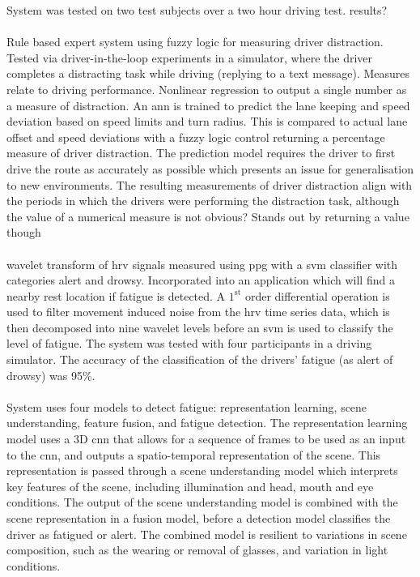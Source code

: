 \documentclass[11pt, parskip=half*,twoside=false]{scrbook}
\begin{document}
System was tested on two test subjects over a two hour driving test. results?

\paragraph{\citet{aksjonovDetectionEvaluationDriver2019}} Rule based expert system using fuzzy logic for measuring driver distraction. Tested via driver-in-the-loop experiments in a simulator, where the driver completes a distracting task while driving (replying to a text message). Measures relate to driving performance. Nonlinear regression to output a single number as a measure of distraction. An \gls{ann} is trained to predict the lane keeping and speed deviation based on speed limits and turn radius. This is compared to actual lane offset and speed deviations with a fuzzy logic control returning a percentage measure of driver distraction. The prediction model requires the driver to first drive the route as accurately as possible which presents an issue for generalisation to new environments. The resulting measurements of driver distraction align with the periods in which the drivers were performing the distraction task, although the value of a numerical measure is not obvious?  Stands out by returning a value though

\paragraph{\citet{liDetectionDriverDrowsiness2013}} wavelet transform of \gls{hrv} signals measured using \gls{ppg} with a \gls{svm} classifier with categories alert and drowsy. Incorporated into an application which will find a nearby rest location if fatigue is detected. A $1^\text{st}$ order differential operation is used to filter movement induced noise from the  \gls{hrv} time series data, which is then decomposed into nine wavelet levels before an \gls{svm} is used to classify the level of fatigue. The system was tested with four participants in a driving simulator. The accuracy of the classification of the drivers' fatigue (as alert of drowsy) was 95\%.

\paragraph{\citet{yuDriverDrowsinessDetection2019}} System uses four models to detect fatigue: representation learning, scene understanding, feature fusion, and fatigue detection. The representation learning model uses a 3D \gls{cnn} that allows for a sequence of frames to be used as an input to the \gls{cnn}, and outputs a spatio-temporal representation of the scene. This representation is passed through a scene understanding model which interprets key features of the scene, including illumination and head, mouth and eye conditions. The output of the scene understanding model is combined with the scene representation in a fusion model, before a detection model classifies the driver as fatigued or alert. The combined model is resilient to variations in scene composition, such as the wearing or removal of glasses, and variation in light conditions. 
 
\end{document}
